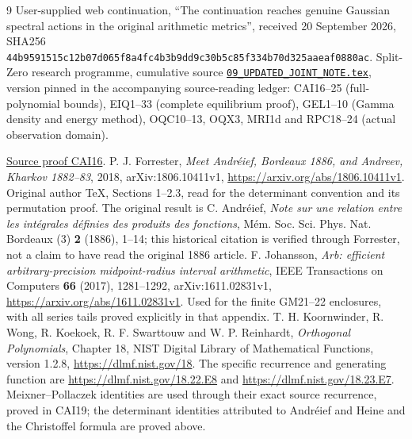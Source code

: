 \documentclass[11pt]{article}
\begin{document}
\begin{thebibliography}{9}
 User-supplied web continuation, ``The continuation reaches
genuine Gaussian spectral actions in the original arithmetic metrics'',
received 20 September 2026, SHA256
\texttt{44b9591515c12b07d065f8a4fc4b3b9dd9c30b5c85f334b70d325aaeaf0880ac}.
 Split-Zero research programme, cumulative source
\href{https://github.com/KokunoYumeto/zeta-function-research-reader/blob/5992ad50c0f2a06921f1fcaded7b4e38097c0739/workbenches/splitzero-tandem/continuations/20260920-original-kernel-mixed-determinants/cumulative/09_UPDATED_JOINT_NOTE.tex\#L1}{\texttt{09\_UPDATED\_JOINT\_NOTE.tex}}, version pinned in the accompanying
source-reading ledger: CAI16--25 (full-polynomial bounds), EIQ1--33
(complete equilibrium proof), GEL1--10 (Gamma density and energy method),
OQC10--13, OQX3, MRI1d and RPC18--24 (actual observation domain).

\href{https://github.com/KokunoYumeto/zeta-function-research-reader/blob/5992ad50c0f2a06921f1fcaded7b4e38097c0739/workbenches/splitzero-tandem/continuations/20260920-original-kernel-mixed-determinants/cumulative/09_UPDATED_JOINT_NOTE.tex\#L63199}{Source proof CAI16}.
 P. J. Forrester, \emph{Meet Andr\'eief, Bordeaux 1886,
and Andreev, Kharkov 1882--83}, 2018, arXiv:1806.10411v1,
\url{https://arxiv.org/abs/1806.10411v1}. Original author TeX, Sections
1--2.3, read for the determinant convention and its permutation proof.
The original result is C. Andr\'eief, \emph{Note sur une relation entre
les int\'egrales d\'efinies des produits des fonctions},
M\'em. Soc. Sci. Phys. Nat. Bordeaux (3) \textbf{2} (1886), 1--14;
this historical citation is verified through Forrester, not a claim
to have read the original 1886 article.
 F. Johansson, \emph{Arb: efficient arbitrary-precision
midpoint-radius interval arithmetic}, IEEE Transactions on Computers
\textbf{66} (2017), 1281--1292, arXiv:1611.02831v1,
\url{https://arxiv.org/abs/1611.02831v1}. Used for the finite GM21--22
enclosures, with all series tails proved explicitly in that appendix.
 T. H. Koornwinder, R. Wong, R. Koekoek,
R. F. Swarttouw and W. P. Reinhardt, \emph{Orthogonal Polynomials},
Chapter 18, NIST Digital Library of Mathematical Functions, version 1.2.8,
\url{https://dlmf.nist.gov/18}. The specific recurrence and generating
function are \url{https://dlmf.nist.gov/18.22.E8} and
\url{https://dlmf.nist.gov/18.23.E7}.
Meixner--Pollaczek identities are used through their exact source
recurrence, proved in CAI19; the determinant identities attributed to
Andr\'eief and Heine and the Christoffel formula are proved above.
\end{thebibliography}
\end{document}
